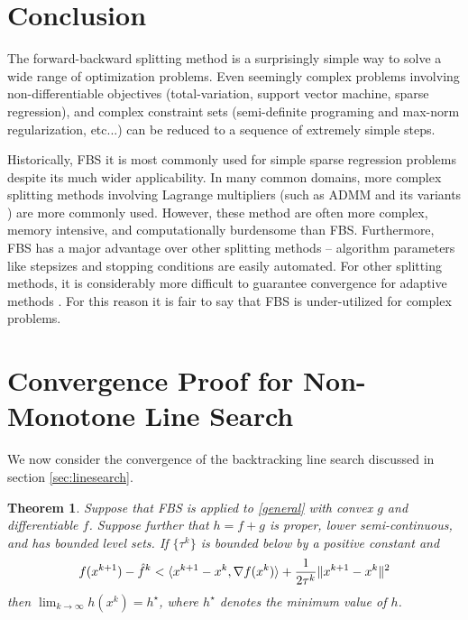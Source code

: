 \documentclass{amsart}
\newcommand{\eqn}[2]{\begin{equation}\label{#1}#2\end{equation}}
\newcommand{\ra}{\rangle}
\newcommand{\la}{\langle}
\newcommand{\kp}{^{k+1}}
\newcommand{\opt}{^\star}
\newtheorem{theorem}{Theorem}
\theoremstyle{definition}
\begin{document}
\section{Conclusion}
The forward-backward splitting method is a surprisingly simple way to solve a wide range of optimization problems.  Even seemingly complex problems involving non-differentiable objectives (total-variation, support vector machine, sparse regression), and complex constraint sets (semi-definite programing and max-norm regularization, etc...) can be reduced to a sequence of extremely simple steps.

Historically, FBS it is most commonly used for simple sparse regression problems despite its much wider applicability.  In many common domains, more complex splitting methods involving Lagrange multipliers (such as ADMM \cite{GL89, BPCPE10} and its variants \cite{EZC09,CP10}) are more commonly used.  However, these method are often more complex, memory intensive, and computationally burdensome than FBS.  Furthermore, FBS has a major advantage over other splitting methods -- algorithm parameters like stepsizes and stopping conditions are easily automated.  For other splitting methods, it is considerably more difficult to guarantee convergence for adaptive methods \cite{HYW00,GEB13}.
 For this reason it is fair to say that FBS is under-utilized for complex problems. 





\newpage

\appendix
\section{Convergence Proof for Non-Monotone Line Search}

We now consider the convergence of the backtracking line search discussed in section \ref{sec:linesearch}.
  \begin{theorem} \label{thm:converge}
  Suppose that FBS is applied to \eqref{general} with convex $g$ and differentiable $f$.  Suppose further that $h=f+g$ is   proper, lower semi-continuous, and has bounded level sets.     If $\{\tau^k\}$ is bounded below by a positive constant and  
 \eqn{backtrack}{
  f(x\kp)-  \hat f^k < \\ \la x\kp -x^k, \nabla f(x^k) \ra + \frac{1}{2\tau^k}  \| x\kp-x^k\|^2 
  }
  then
  $ \lim_{k\to\infty} h(x^k) = h\opt$,
  where $h\opt$ denotes the minimum value of $h$.
  \end{theorem}
\end{document}
